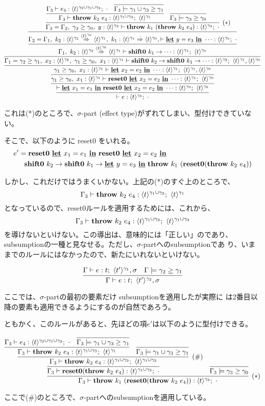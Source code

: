\documentclass[dvipdfmx]{jsarticle}
\newcommand\longer[2]{{#1} \ord {#2}}
\newcommand\uni{\cup} %
\begin{document}
\[
\proofone
\]

これは(*)のところで、$\sigma$-part (effect type)がずれてしまい、型付けできていない。

そこで、以下のように reset0 をいれる。
\begin{align*}
e' &= \textbf{reset0}~\underline{\textbf{let}}~x_1=e_1~\underline{\textbf{in}}~\textbf{reset0}~\underline{\textbf{let}}~x_2=e_2~\underline{\textbf{in}} \\
  &\phantom{=}  \textbf{shift0}~{k_2}\to{\textbf{shift0}~{k_1}\to{\underline{\textbf{let}}~y=e_3~\underline{\textbf{in}}~
                  \textbf{throw}~{k_1}~{(\textbf{reset0}(\textbf{throw}~{k_2}~{e_4}))}}}
\end{align*}

しかし、これだけではうまくいかない。上記の(*)のすぐ上のところで、
\[
\Gamma_3 \vdash \throw{k_2}{e_4} : \tonethree;~\tone
\]
となっているので、reset0ルールを適用するためには、これから、
\[
\Gamma_3 \vdash \throw{k_2}{e_4} : \tonethree;~\tonethree
\]
を導けないといけない。この導出は、意味的には「正しい」のであり、
subsumptionの一種と見なせる。ただし、$\sigma$-partへのsubsumptionであ
り、いままでのルールにはなかったので、新たにいれないといけない。

  \[
    \infer
    {\Gamma \vdash e : t;~\codeT{t'}{\gamma_2},\sigma}
    {\Gamma \vdash e : t;~\codeT{t'}{\gamma_1},\sigma
      & \Gamma \models \gamma_2 \ord \gamma_1
    }
  \]

ここでは、$\sigma$-partの最初の要素だけ subsumptionを適用したが実際に
は2番目以降の要素も適用できるようにするのが自然であろう。

ともかく、このルールがあると、先ほどの項$e'$は以下のように型付けできる。

\def\prooffive{
\infer[(*)]
 {\Gamma_3\vdash \throw{k_1}{(\Resetz(\throw{k_2}{e_4}))} : \tthree;~\cdot{}}
 {\infer
   {\Gamma_3 \vdash \Resetz(\throw{k_2}{e_4}) : \tonethree; ~\cdot{}}
   {\infer[(\#)]
      {\Gamma_3 \vdash \throw{k_2}{e_4} : \tonethree;~\tonethree}
      {\infer
        {\Gamma_3 \vdash \throw{k_2}{e_4} : \tonethree;~\tone}
        {\Gamma_3 \vdash e_4 : 
                       \codeT{t}{\gamma_2\uni\gamma_1\uni\gamma_3};~\cdot
        & \infer{\Gamma_3 \models
                         \longer{\gamma_1\uni\gamma_3}{\gamma_1}}{}
        }
      & \infer{\Gamma_3 \models \longer{\gamma_1\uni\gamma_3}{\gamma_1}}{}
      }
   }
  & \infer{\Gamma_3 \models \longer{\gamma_3}{\gamma_0}}{}
  }
}

\[
\prooffive
\]

ここで(\#)のところで、$\sigma$-partへのsubsumptionを適用している。
\end{document}
